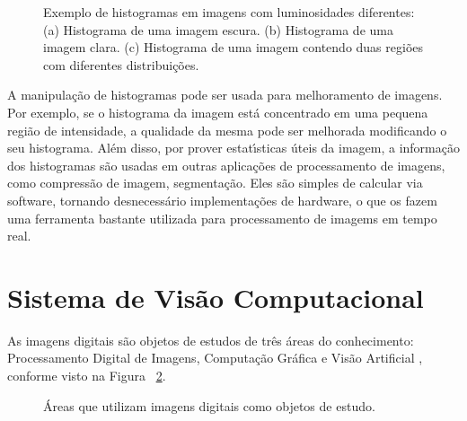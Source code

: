 \begin{figure}[h]
\centering
{}
\caption[Exemplo de histogramas em imagens com luminosidades diferentes]{Exemplo de histogramas em imagens com luminosidades 
diferentes:(a) Histograma de uma imagem escura. (b) Histograma de uma imagem clara. (c) Histograma de uma imagem contendo duas 
regi\~{o}es com diferentes distribui\c{c}\~{o}es.} \label{FIG:HIST}
\end{figure}

A manipula\c{c}\~{a}o de histogramas pode ser usada para melhoramento de imagens. Por exemplo, se o histograma da imagem est\'{a} concentrado 
em uma pequena regi\~{a}o de intensidade, a qualidade da mesma pode ser melhorada modificando o seu histograma. Al\'{e}m disso, por prover 
estat\'{\i}sticas \'{u}teis da imagem, a informa\c{c}\~{a}o dos histogramas s\~{a}o usadas em outras aplica\c{c}\~{o}es de processamento de imagens, como 
compress\~{a}o de imagem, segmenta\c{c}\~{a}o. Eles s\~{a}o simples de calcular via software, tornando desnecess\'{a}rio implementa\c{c}\~{o}es de hardware, o 
que os fazem uma ferramenta bastante utilizada para processamento de imagems em tempo real\cite{GONZALEZ:2008}.

\section{Sistema de Vis\~{a}o Computacional}

As imagens digitais s\~{a}o objetos de estudos de tr\^{e}s \'{a}reas do conhecimento: Processamento Digital de Imagens, Computa\c{c}\~{a}o Gr\'{a}fica e 
Vis\~{a}o Artificial \cite{AUZUIR:2005}, conforme visto na Figura ~\ref{FIG:AREASIMAGEMDIGITAL}.

\begin{figure}[h]
\centering
{}
\caption{\'{A}reas que utilizam imagens digitais como objetos de estudo.}\label{FIG:AREASIMAGEMDIGITAL}
\end{figure}

